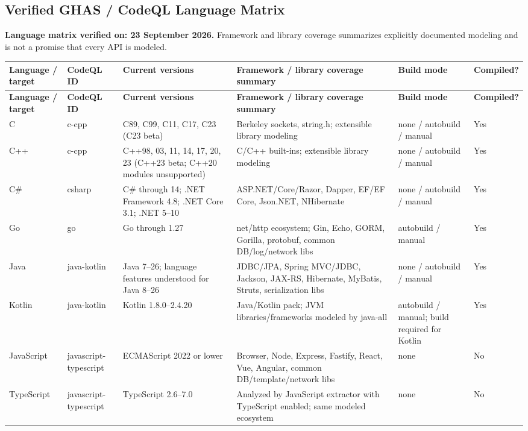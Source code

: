 \documentclass[10pt,letterpaper]{article}
\begin{document}
\begin{landscape}
\section{Verified GHAS / CodeQL Language Matrix}
\textbf{Language matrix verified on: 23 September 2026.} Framework and library coverage summarizes explicitly documented modeling and is not a promise that every API is modeled.

\scriptsize
\setlength{\tabcolsep}{3pt}
\begin{longtable}{@{}P{0.72in}P{0.9in}P{1.45in}P{3.55in}P{1.25in}P{0.65in}@{}}
\toprule
\textbf{Language / target} & \textbf{CodeQL ID} & \textbf{Current versions} & \textbf{Framework / library coverage summary} & \textbf{Build mode} & \textbf{Compiled?}\\
\midrule
\endfirsthead
\toprule
\textbf{Language / target} & \textbf{CodeQL ID} & \textbf{Current versions} & \textbf{Framework / library coverage summary} & \textbf{Build mode} & \textbf{Compiled?}\\
\midrule
\endhead
C & c-cpp & C89, C99, C11, C17, C23 (C23 beta) & Berkeley sockets, string.h; extensible library modeling & none / autobuild / manual & Yes\\
C++ & c-cpp & C++98, 03, 11, 14, 17, 20, 23 (C++23 beta; C++20 modules unsupported) & C/C++ built-ins; extensible library modeling & none / autobuild / manual & Yes\\
C\# & csharp & C\# through 14; .NET Framework 4.8; .NET Core 3.1; .NET 5--10 & ASP.NET/Core/Razor, Dapper, EF/EF Core, Json.NET, NHibernate & none / autobuild / manual & Yes\\
Go & go & Go through 1.27 & net/http ecosystem; Gin, Echo, GORM, Gorilla, protobuf, common DB/log/network libs & autobuild / manual & Yes\\
Java & java-kotlin & Java 7--26; language features understood for Java 8--26 & JDBC/JPA, Spring MVC/JDBC, Jackson, JAX-RS, Hibernate, MyBatis, Struts, serialization libs & none / autobuild / manual & Yes\\
Kotlin & java-kotlin & Kotlin 1.8.0--2.4.20 & Java/Kotlin pack; JVM libraries/frameworks modeled by java-all & autobuild / manual; build required for Kotlin & Yes\\
JavaScript & javascript-typescript & ECMAScript 2022 or lower & Browser, Node, Express, Fastify, React, Vue, Angular, common DB/template/network libs & none & No\\
TypeScript & javascript-typescript & TypeScript 2.6--7.0 & Analyzed by JavaScript extractor with TypeScript enabled; same modeled ecosystem & none & No\\

\end{longtable}
\end{landscape}
\end{document}
